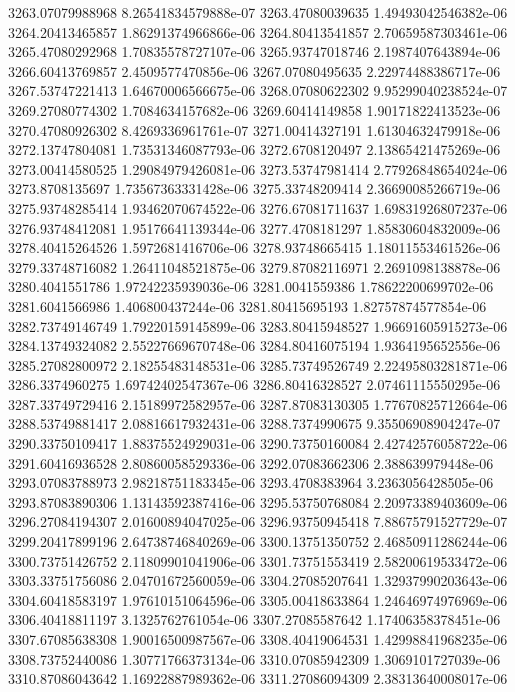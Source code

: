 {3263.07079988968 8.26541834579888e-07
3263.47080039635 1.49493042546382e-06
3264.20413465857 1.86291374966866e-06
3264.80413541857 2.70659587303461e-06
3265.47080292968 1.70835578727107e-06
3265.93747018746 2.1987407643894e-06
3266.60413769857 2.4509577470856e-06
3267.07080495635 2.22974488386717e-06
3267.53747221413 1.64670006566675e-06
3268.07080622302 9.95299040238524e-07
3269.27080774302 1.7084634157682e-06
3269.60414149858 1.90171822413523e-06
3270.47080926302 8.4269336961761e-07
3271.00414327191 1.61304632479918e-06
3272.13747804081 1.73531346087793e-06
3272.6708120497 2.13865421475269e-06
3273.00414580525 1.29084979426081e-06
3273.53747981414 2.77926848654024e-06
3273.8708135697 1.73567363331428e-06
3275.33748209414 2.36690085266719e-06
3275.93748285414 1.93462070674522e-06
3276.67081711637 1.69831926807237e-06
3276.93748412081 1.95176641139344e-06
3277.4708181297 1.85830604832009e-06
3278.40415264526 1.5972681416706e-06
3278.93748665415 1.18011553461526e-06
3279.33748716082 1.26411048521875e-06
3279.87082116971 2.2691098138878e-06
3280.4041551786 1.97242235939036e-06
3281.0041559386 1.78622200699702e-06
3281.6041566986 1.406800437244e-06
3281.80415695193 1.82757874577854e-06
3282.73749146749 1.79220159145899e-06
3283.80415948527 1.96691605915273e-06
3284.13749324082 2.55227669670748e-06
3284.80416075194 1.9364195652556e-06
3285.27082800972 2.18255483148531e-06
3285.73749526749 2.22495803281871e-06
3286.3374960275 1.69742402547367e-06
3286.80416328527 2.07461115550295e-06
3287.33749729416 2.15189972582957e-06
3287.87083130305 1.77670825712664e-06
3288.53749881417 2.08816617932431e-06
3288.7374990675 9.35506908904247e-07
3290.33750109417 1.88375524929031e-06
3290.73750160084 2.42742576058722e-06
3291.60416936528 2.80860058529336e-06
3292.07083662306 2.388639979448e-06
3293.07083788973 2.98218751183345e-06
3293.4708383964 3.2363056428505e-06
3293.87083890306 1.13143592387416e-06
3295.53750768084 2.20973389403609e-06
3296.27084194307 2.01600894047025e-06
3296.93750945418 7.88675791527729e-07
3299.20417899196 2.64738746840269e-06
3300.13751350752 2.46850911286244e-06
3300.73751426752 2.11809901041906e-06
3301.73751553419 2.58200619533472e-06
3303.33751756086 2.04701672560059e-06
3304.27085207641 1.32937990203643e-06
3304.60418583197 1.97610151064596e-06
3305.00418633864 1.24646974976969e-06
3306.40418811197 3.1325762761054e-06
3307.27085587642 1.17406358378451e-06
3307.67085638308 1.90016500987567e-06
3308.40419064531 1.42998841968235e-06
3308.73752440086 1.30771766373134e-06
3310.07085942309 1.3069101727039e-06
3310.87086043642 1.16922887989362e-06
3311.27086094309 2.38313640008017e-06
}

